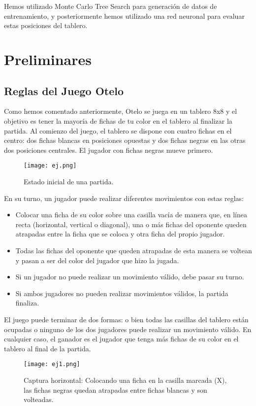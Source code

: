 \documentclass[conference]{IEEEtran}
\begin{document}
Hemos utilizado Monte Carlo Tree Search para generación de datos de entrenamiento, y posteriormente hemos utilizado una red neuronal para evaluar estas posiciones del tablero.

\section{Preliminares}
\subsection{Reglas del Juego Otelo}
Como hemos comentado anteriormente, Otelo se juega en un tablero 8x8 y el objetivo es tener la mayoría de fichas de tu color en el tablero al finalizar la partida. Al comienzo del juego, el tablero se dispone con cuatro fichas en el centro: dos fichas blancas en posiciones opuestas y dos fichas negras en las otras dos posiciones centrales. El jugador con fichas negras mueve primero.

\begin{figure}[htbp]
    \centerline{\texttt{[image: ej.png]}}
    \caption{Estado inicial de una partida.}
    \label{figura}
\end{figure}


En su turno, un jugador puede realizar diferentes movimientos con estas reglas:
\begin{itemize}
    \item Colocar una ficha de su color sobre una casilla vacía de manera que, en línea recta (horizontal, vertical o diagonal), una o más fichas del oponente queden atrapadas entre la ficha que se coloca y otra ficha del propio jugador.
    \item Todas las fichas del oponente que queden atrapadas de esta manera se voltean y pasan a ser del color del jugador que hizo la jugada.
    \item Si un jugador no puede realizar un movimiento válido, debe pasar su turno.
    \item Si ambos jugadores no pueden realizar movimientos válidos, la partida finaliza.
\end{itemize}

El juego puede terminar de dos formas: o bien todas las casillas del tablero están ocupadas o ninguno de los dos jugadores puede realizar un movimiento válido. En cualquier caso, el ganador es el jugador que tenga más fichas de su color en el tablero al final de la partida.

\begin{figure}[htbp]
    \centerline{\texttt{[image: ej1.png]}}
    \caption{Captura horizontal: Colocando una ficha en la casilla marcada (X), las fichas negras quedan atrapadas entre fichas blancas y son volteadas.}
    \label{figura}
\end{figure}
\end{document}
